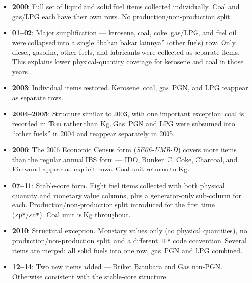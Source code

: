 \documentclass[11pt, a4paper]{article}
\begin{document}
\begin{itemize}[noitemsep]
  \item \textbf{2000}: Full set of liquid and solid fuel items collected individually.
        Coal and gas/LPG each have their own rows. No production/non-production split.

  \item \textbf{01--02}: Major simplification --- kerosene, coal, coke, gas/LPG, and fuel oil
        were collapsed into a single ``bahan bakar lainnya'' (other fuels) row.
        Only diesel, gasoline, other fuels, and lubricants were collected as separate items.
        This explains lower physical-quantity coverage for kerosene and coal in those years.

  \item \textbf{2003}: Individual items restored. Kerosene, coal, gas~PGN, and LPG reappear
        as separate rows.

  \item \textbf{2004--2005}: Structure similar to 2003, with one important exception:
        coal is recorded in \textbf{Ton} rather than Kg. Gas~PGN and LPG were
        subsumed into ``other fuels'' in 2004 and reappear separately in 2005.

  \item \textbf{2006}: The 2006 Economic Census form (\textit{SE06-UMB-D}) covers more items
        than the regular annual IBS form --- IDO, Bunker~C, Coke, Charcoal, and Firewood appear
        as explicit rows. Coal unit returns to Kg.

  \item \textbf{07--11}: Stable-core form. Eight fuel items collected with both physical
        quantity and monetary value columns, plus a generator-only sub-column for each.
        Production/non-production split introduced for the first time (\texttt{zp*}/\texttt{zn*}).
        Coal unit is Kg throughout.

  \item \textbf{2010}: Structural exception. Monetary values only (no physical quantities),
        no production/non-production split, and a different \texttt{IF*} code convention.
        Several items are merged: all solid fuels into one row, gas~PGN and LPG combined.

  \item \textbf{12--14}: Two new items added --- Briket Batubara and Gas non-PGN.
        Otherwise consistent with the stable-core structure.
\end{itemize}
\end{document}
